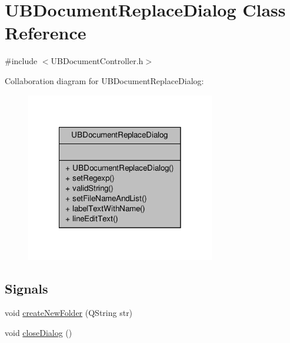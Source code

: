 \hypertarget{class_u_b_document_replace_dialog}{\section{U\-B\-Document\-Replace\-Dialog Class Reference}
\label{d0/d6c/class_u_b_document_replace_dialog}
}


{\ttfamily \#include $<$U\-B\-Document\-Controller.\-h$>$}



Collaboration diagram for U\-B\-Document\-Replace\-Dialog\-:
\nopagebreak
\begin{figure}[H]
\begin{center}
\leavevmode
\includegraphics[width=234pt]{d4/dc1/class_u_b_document_replace_dialog__coll__graph}
\end{center}
\end{figure}
\subsection*{Signals}
\begin{DoxyCompactItemize}
\item 
void \hyperlink{class_u_b_document_replace_dialog_a975c8f58aed7245b424330fb257a3aa5}{create\-New\-Folder} (Q\-String str)
\item 
void \hyperlink{class_u_b_document_replace_dialog_ab6c5c723d67de91c164f373a85c05c19}{close\-Dialog} ()
\end{DoxyCompactItemize}
